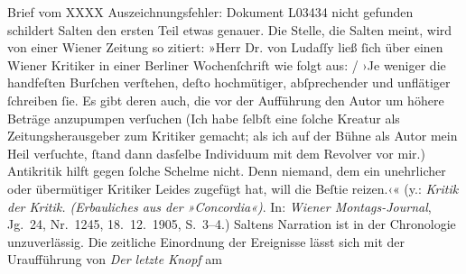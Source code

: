 {{{                  Brief vom XXXX Auszeichnungsfehler: Dokument L03434 nicht gefunden
                  schildert Salten den ersten Teil etwas
                  genauer. Die Stelle, die Salten meint, wird
                  von einer Wiener Zeitung so zitiert: »Herr Dr. von Ludaſſy ließ{ }ſich über
                        einen Wiener Kritiker in einer Berliner Wochenſchrift wie folgt aus:{ / }›Je weniger die handfeſten Burſchen verſtehen, deſto hochmütiger,
                        abſprechender und unflätiger{ }ſchreiben{ }ſie. Es gibt deren auch, die vor der
                        Aufführung den Autor um höhere Beträge anzupumpen verſuchen (Ich habe{ }ſelbſt
                        eine{ }ſolche Kreatur als Zeitungsherausgeber zum Kritiker gemacht; als ich
                        auf der Bühne als Autor mein Heil verſuchte,{ }ſtand dann dasſelbe Individuum
                        mit dem Revolver vor mir.) Antikritik hilft gegen{ }ſolche Schelme nicht. Denn
                        niemand, dem ein unehrlicher oder übermütiger Kritiker Leides zugefügt hat,
                        will die Beſtie reizen.‹« (y.: \emph{Kritik der Kritik.
                        (Erbauliches aus der »Concordia«)}. In: \emph{Wiener Montags-Journal}, Jg. 24, Nr. 1245, 18. 12. 1905,
                     S. 3–4.) Saltens Narration ist in
                  der Chronologie unzuverlässig. Die zeitliche Einordnung der Ereignisse lässt sich
                  mit der Uraufführung von \emph{Der letzte Knopf} am
}}}
